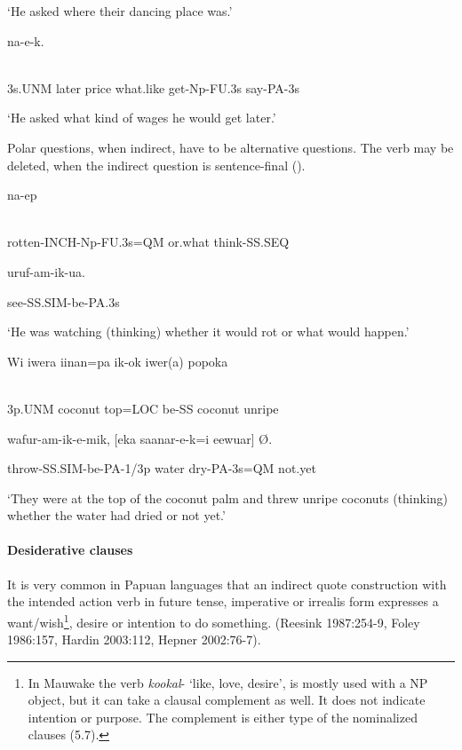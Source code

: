 `He asked where their dancing place was.'

\ea%
\label{ex:x1590}
  na-e-k. \\
      \\
\glt
\z

3s.UNM  later  price  what.like  get-Np-FU.3s  say-PA-3s

`He asked what kind of wages he would get later.'

Polar questions, when indirect, have to be alternative questions. The verb  may be deleted, when the indirect question is sentence-final (). 

\ea%
\label{ex:x1591}
\gll [Beel-al-i-non=i  kamenion]  na-ep  \\
      \\
\glt
\z

rotten-INCH-Np-FU.3s=QM  or.what  think-SS.SEQ

uruf-am-ik-ua.

see-SS.SIM-be-PA.3s

`He was watching (thinking) whether it would rot or what would happen.'

\ea%
\label{ex:x1593}
\gll Wi  iwera  iinan=pa  ik-ok  iwer(a)  popoka  \\
      \\
\glt
\z

3p.UNM  coconut  top=LOC  be-SS  coconut  unripe

wafur-am-ik-e-mik,  [eka  saanar-e-k=i  eewuar] {\O}.

throw-SS.SIM-be-PA-1/3p  water  dry-PA-3s=QM  not.yet

`They were at the top of the coconut palm and threw unripe coconuts (thinking) whether the water had dried or not yet.'

\paragraph[Desiderative clauses]{Desiderative clauses}
\hypertarget{RefHeading23481935131865}{}
It is very common in Papuan languages that an indirect quote construction with the intended action verb in future tense, imperative or irrealis form expresses a want/wish\footnote{In Mauwake the verb \textit{kookal}- `like, love, desire', is mostly used with a NP object, but it can take a clausal complement as well. It does not indicate intention or purpose. The complement is either type of the nominalized clauses (5.7).}, desire or intention to do something. (Reesink 1987:254-9, Foley 1986:157, Hardin 2003:112, Hepner 2002:76-7).

